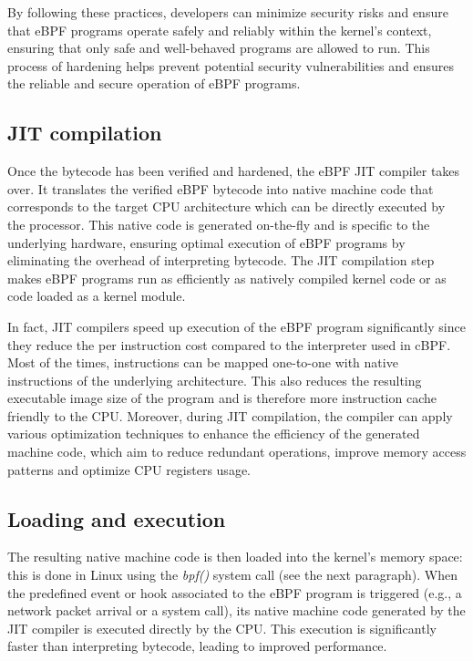 By following these practices, developers can minimize security risks and ensure that eBPF programs operate safely and reliably within the kernel's context, ensuring that only safe and well-behaved programs are allowed to run.
This process of hardening helps prevent potential security vulnerabilities and ensures the reliable and secure operation of eBPF programs.

\subsection{JIT compilation}

Once the bytecode has been verified and hardened, the eBPF JIT compiler takes over. 
It translates the verified eBPF bytecode into native machine code that corresponds to the target CPU architecture which can be directly executed by the processor. 
This native code is generated on-the-fly and is specific to the underlying hardware, ensuring optimal execution of eBPF programs by eliminating the overhead of interpreting bytecode.
The JIT compilation step makes eBPF programs run as efficiently as natively compiled kernel code or as code loaded as a kernel module.

In fact, JIT compilers speed up execution of the eBPF program significantly since they reduce the per instruction cost compared to the interpreter used in cBPF. 
Most of the times, instructions can be mapped one-to-one with native instructions of the underlying architecture. 
This also reduces the resulting executable image size of the program and is therefore more instruction cache friendly to the CPU.
Moreover, during JIT compilation, the compiler can apply various optimization techniques to enhance the efficiency of the generated machine code, which aim to reduce redundant operations, improve memory access patterns and optimize CPU registers usage.

\subsection{Loading and execution}

The resulting native machine code is then loaded into the kernel's memory space: this is done in Linux using the \textit{bpf()} system call (see the next paragraph).
When the predefined event or hook associated to the eBPF program is triggered (e.g., a network packet arrival or a system call), its native machine code generated by the JIT compiler is executed directly by the CPU. 
This execution is significantly faster than interpreting bytecode, leading to improved performance.

